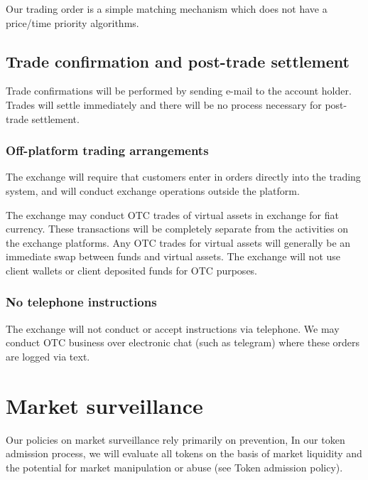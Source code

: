 Our trading order is a simple matching mechanism which does not have a
price/time priority algorithms.


\subsection{Trade confirmation and post-trade settlement}

Trade confirmations will be performed by sending e-mail to the account
holder.  Trades will settle immediately and there will be no
process necessary for post-trade settlement.

\subsubsection{Off-platform trading arrangements}
The exchange will require that customers enter in orders directly into
the trading system, and will conduct exchange operations outside
the platform.

The exchange may conduct OTC trades of virtual assets in exchange for
fiat currency.  These transactions will be completely separate from
the activities on the exchange platforms.  Any OTC trades for virtual
assets will generally be an immediate swap between funds
and virtual assets.  The exchange will not use client wallets or
client deposited funds for OTC purposes.

\subsubsection{No telephone instructions}
The exchange will not conduct or accept instructions via telephone.
We may conduct OTC business over electronic chat (such as telegram) where
these orders are logged via text.

\section{Market surveillance}

Our policies on market surveillance rely primarily on prevention, In
our token admission process, we will evaluate all tokens on the basis
of market liquidity and the potential for market manipulation or abuse
(see Token admission policy).

